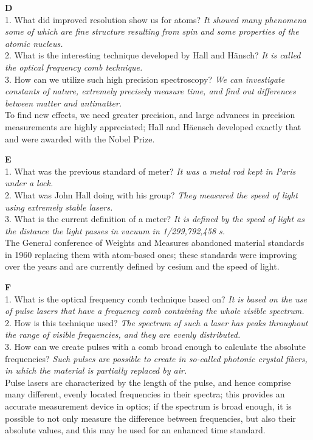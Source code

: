\documentclass[a4paper, 12pt]{article}
\def\ans#1{\textit{#1}}
\begin{document}
\begin{multicols}{2}
\textbf{D}
\\1. What did improved resolution show us for atoms? \ans{It showed many phenomena some of which are fine structure resulting from spin and some properties of the atomic nucleus.}
\\2. What is the interesting technique developed by Hall and H\"ansch? \ans{It is called the optical frequency comb technique.}
\\3. How can we utilize such high precision spectroscopy? \ans{We can investigate constants of nature, extremely precisely measure time, and find out differences between matter and antimatter.}
\\ To find new effects, we need greater precision, and large advances in precision measurements are highly appreciated; Hall and H\"aensch developed exactly that and were awarded with the Nobel Prize.

\textbf{E}
\\1. What was the previous standard of meter? \ans{It was a metal rod kept in Paris under a lock.}
\\2. What was John Hall doing with his group? \ans{They measured the speed of light using extremely stable lasers.}
\\3. What is the current definition of a meter? \ans{It is defined by the speed of light as the distance the light passes in vacuum in 1/299,792,458 s.}
\\ The General conference of Weights and Measures abandoned material standards in 1960 replacing them with atom-based ones; these standards were improving over the years and are currently defined by cesium and the speed of light.

\textbf{F}
\\1. What is the optical frequency comb technique based on? \ans{It is based on the use of pulse lasers that have a frequency comb containing the whole visible spectrum.}
\\2. How is this technique used? \ans{The spectrum of such a laser has peaks throughout the range of visible frequencies, and they are evenly distributed.}
\\3. How can we create pulses with a comb broad enough to calculate the absolute frequencies? \ans{Such pulses are possible to create in so-called photonic crystal fibers, in which the material is partially replaced by air.}
\\ Pulse lasers are characterized by the length of the pulse, and hence comprise many different, evenly located frequencies in their spectra; this provides an accurate measurement device in optics; if the spectrum is broad enough, it is possible to not only measure the difference between frequencies, but also their absolute values, and this may be used for an enhanced time standard.


\end{multicols}
\end{document}
